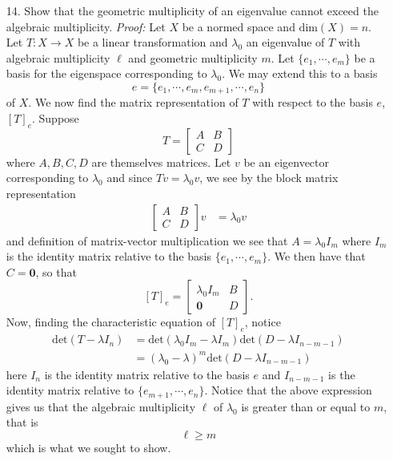 \documentclass{article}
\begin{document}
\begin{itemize}
    
    \item[14.] Show that the geometric multiplicity of an eigenvalue cannot exceed the algebraic multiplicity.
    \newline\newline
    \textit{Proof:} Let $X$ be a normed space and $\text{dim}(X) = n$. Let $T: X \to X$ be a linear transformation and $\lambda_0$ an eigenvalue of $T$ with algebraic multiplicity $\ell$ and geometric multiplicity $m$. Let $\{e_1, \cdots, e_m\}$ be a basis for the eigenspace corresponding to $\lambda_0$. We may extend this to a basis 
    \[e = \{e_1,\cdots, e_m, e_{m+1}, \cdots, e_n\}\]
    of $X$. We now find the matrix representation of $T$ with respect to the basis $e$, $[T]_e$. Suppose 
    \[T = \begin{bmatrix}
        A & B\\
        C & D
    \end{bmatrix}\]
    where $A,B,C,D$ are themselves matrices. Let $v$ be an eigenvector corresponding to $\lambda_0$ and since $Tv = \lambda_0v$, we see by the block matrix representation 
    \begin{align*}
        \begin{bmatrix}
            A & B\\
            C & D
        \end{bmatrix}v & = \lambda_0v
    \end{align*}
    and definition of matrix-vector multiplication we see that $A = \lambda_0 I_m$ where $I_m$ is the identity matrix relative to the basis $\{e_1, \cdots, e_m\}$. We then have that $C = \mathbf{0}$, so that
    \[[T]_e = \begin{bmatrix}
       \lambda_0 I_m & B\\
       \mathbf{0} & D
    \end{bmatrix}.\]
    Now, finding the characteristic equation of $[T]_e$, notice
    \begin{align*}
        \text{det}(T - \lambda I_{n}) &= \text{det}(\lambda_0I_m - \lambda I_m)\text{det}(D - \lambda I_{n - m - 1})\\
        &= (\lambda_0 - \lambda)^m\text{det}(D - \lambda I_{n - m -1})
    \end{align*}
    here $I_n$ is the identity matrix relative to the basis $e$ and $I_{n - m - 1}$ is the identity matrix relative to $\{e_{m+1}, \cdots, e_n\}$. Notice that the above expression gives us that the algebraic multiplicity $\ell$ of $\lambda_0$ is greater than or equal to $m$, that is
    \[\ell \geq m\]
    which is what we sought to show.
\end{itemize}
\end{document}
